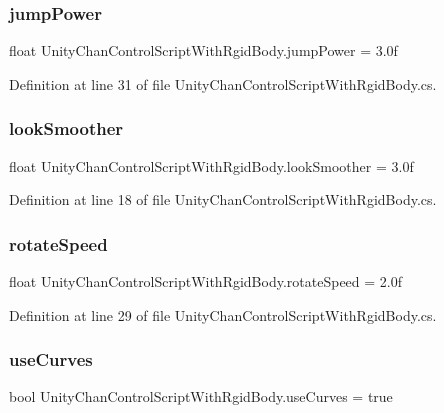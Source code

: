 \subsubsection{jump\+Power}
{\footnotesize\ttfamily float Unity\+Chan\+Control\+Script\+With\+Rgid\+Body.\+jump\+Power = 3.\+0f}



Definition at line 31 of file Unity\+Chan\+Control\+Script\+With\+Rgid\+Body.\+cs.

\mbox{\label{class_unity_chan_control_script_with_rgid_body_a5f7743f30dcc62bddae1be0fe31a7a91}} 
\subsubsection{look\+Smoother}
{\footnotesize\ttfamily float Unity\+Chan\+Control\+Script\+With\+Rgid\+Body.\+look\+Smoother = 3.\+0f}



Definition at line 18 of file Unity\+Chan\+Control\+Script\+With\+Rgid\+Body.\+cs.

\mbox{\label{class_unity_chan_control_script_with_rgid_body_a57c1f8708e91b4520e79d36a0cacf66f}} 
\subsubsection{rotate\+Speed}
{\footnotesize\ttfamily float Unity\+Chan\+Control\+Script\+With\+Rgid\+Body.\+rotate\+Speed = 2.\+0f}



Definition at line 29 of file Unity\+Chan\+Control\+Script\+With\+Rgid\+Body.\+cs.

\mbox{\label{class_unity_chan_control_script_with_rgid_body_a4f7c7fc1b25bf1a685c7bf5011776c68}} 
\subsubsection{use\+Curves}
{\footnotesize\ttfamily bool Unity\+Chan\+Control\+Script\+With\+Rgid\+Body.\+use\+Curves = true}



